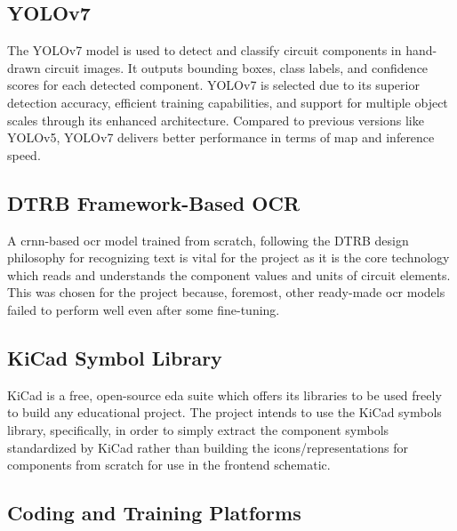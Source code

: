 \subsection{YOLOv7}

The YOLOv7 model is used to detect and classify circuit components in hand-drawn circuit images. It outputs bounding boxes, class labels, and confidence scores for each detected component. YOLOv7 is selected due to its superior detection accuracy, efficient training capabilities, and support for multiple object scales through its enhanced architecture. Compared to previous versions like YOLOv5, YOLOv7 delivers better performance in terms of \gls{map} and inference speed.

\subsection{DTRB Framework-Based OCR}

A \gls{crnn}-based \gls{ocr} model trained from scratch, following the DTRB design philosophy for recognizing text is vital for the project as it is the core technology which reads and understands the component values and units of circuit elements. This was chosen for the project because, foremost, other ready-made \gls{ocr} models failed to perform well even after some fine-tuning.

\subsection{KiCad Symbol Library}

KiCad is a free, open-source \gls{eda} suite which offers its libraries to be used freely to build any educational project. The project intends to use the KiCad symbols library, specifically, in order to simply extract the component symbols standardized by KiCad rather than building the icons/representations for components from scratch for use in the frontend schematic.

\subsection{Coding and Training Platforms}

